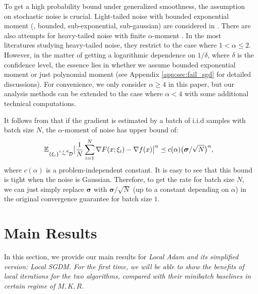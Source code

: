 \documentclass{article} %
\numberwithin{equation}{section}
\begin{document}
\begin{rmk}
To get a high probability bound under generalized smoothness, the assumption on stochastic noise is crucial. 
Light-tailed noise with bounded exponential moment (\eg, bounded, sub-exponential, sub-gaussian) are considered in \citet{harvey2019simple, li2020high, li2024convergence}. 
There are also attempts for heavy-tailed noise with finite $\alpha$-moment \citep{gorbunov2020stochastic, cutkosky2021high, faw2023beyond}.
In the most literatures studying heavy-tailed noise, they restrict to the case where $1<\alpha\leq 2$. 
However, in the matter of getting a logarithmic dependence on $1/\delta$, where $\delta$ is the confidence level, the essence lies in whether we assume bounded exponential moment or just polynomial moment (see Appendix \ref{app:sec:fail_sgd} for detailed discussions).
For convenience, we only consider $\alpha\geq 4$ in this paper, but our analysis methods can be extended to the case where $\alpha<4$ with some additional technical computations.
\end{rmk}

\begin{rmk}\label{rm:mb}
    It follows from \citet{Petrov1992} that if the gradient is estimated by a batch of i.i.d samples with batch size $N$, the $\alpha$-moment of noise has upper bound of:
    \begin{equation}
        \mathbb{E}_{\{\xi_i\}\overset{i.i.d}{\sim} \mathcal{D}} \big|\frac{1}{N}\sum_{i=1}^N\nabla F(x;\xi_i) - \nabla f(x)\big|^{\alpha} \preceq c(\alpha)\big(\boldsymbol{\sigma}/\sqrt{N}\big)^{\alpha},
    \end{equation}
    where $c(\alpha)$ is a problem-independent constant. 
    It is easy to see that this bound is tight when the noise is Gaussian.
    Therefore, to get the rate for batch size $N$, we can just simply replace $\boldsymbol{\sigma}$ with $\boldsymbol{\sigma}/\sqrt{N}$ (up to a constant depending on $\alpha$) in the original convergence guarantee for batch size $1$. 
\end{rmk}

\section{Main Results}


In this section, we provide our main results for \em Local \em Adam and its simplified version: \em Local \em SGDM. For the first time, we will be able to show the benefits of local iterations for the two algorithms, compared with their minibatch baselines in certain regime of $M,K,R$.
\end{document}
